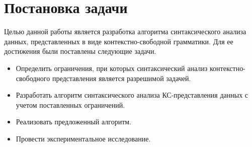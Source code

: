 \section{Постановка задачи}
Целью данной работы является разработка алгоритма синтаксического анализа данных, представленных в виде контекстно-свободной грамматики. Для ее достижения были поставлены следующие задачи.
\begin{itemize}
	\item Определить ограничения, при которых синтаксический анализ \linebreak контекстно-свободного представления является разрешимой задачей.
	\item Разработать алгоритм синтаксического анализа КС-представления данных с учетом поставленных ограничений.
	\item Реализовать предложенный алгоритм.
	\item Провести экспериментальное исследование.
\end{itemize}